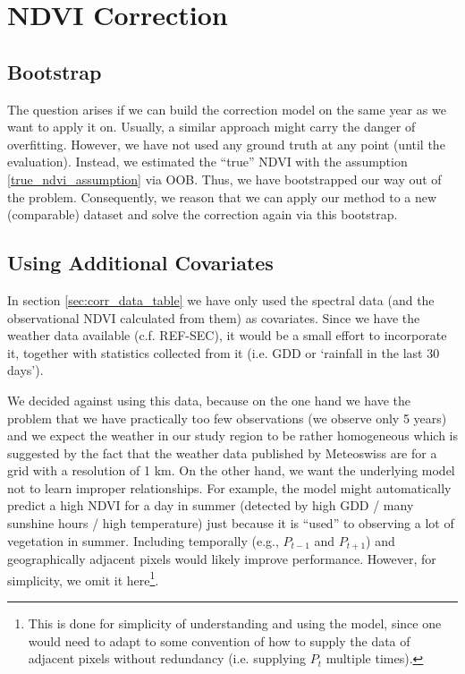 \section{NDVI Correction}{
    \subsection{Bootstrap}
        The question arises if we can build the correction model on the same year as we want to apply it on. Usually, a similar approach might carry the danger of overfitting. However, we have not used any ground truth at any point (until the evaluation). Instead, we estimated the ``true'' NDVI with the assumption \ref{true_ndvi_assumption} via OOB. Thus, we have bootstrapped our way out of the problem. Consequently, we reason that we can apply our method to a new (comparable) dataset and solve the correction again via this bootstrap.
    \subsection{Using Additional Covariates}{
        In section \ref{sec:corr_data_table} we have only used the spectral data (and the observational NDVI calculated from them) as covariates. Since we have the weather data available (c.f. REF-SEC), it would be a small effort to incorporate it, together with statistics collected from it (i.e. GDD or `rainfall in the last 30 days'). 
    
        We decided against using this data, because on the one hand we have the problem that we have practically too few observations (we observe only 5 years) and we expect the weather in our study region to be rather homogeneous which is suggested by the fact that the weather data published by Meteoswiss are for a grid with a resolution of 1 km. On the other hand, we want the underlying model not to learn improper relationships. For example, the model might automatically predict a high NDVI for a day in summer (detected by high GDD / many sunshine hours / high temperature) just because it is ``used'' to observing a lot of vegetation in summer. 
        Including temporally (e.g., $P_{t-1}$ and $P_{t+1}$) and geographically adjacent pixels would likely improve performance. However, for simplicity, we omit it here\footnote{This is done for simplicity of understanding and using the model, since one would need to adapt to some convention of how to supply the data of adjacent pixels without redundancy (i.e. supplying $P_t$ multiple times).}.
    }

}
